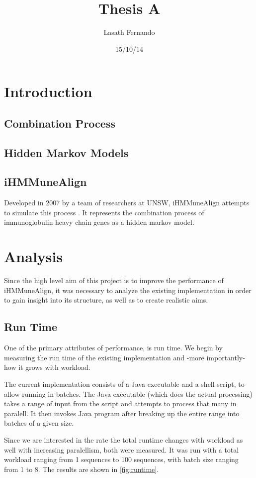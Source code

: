 \documentclass[a4paper,12pt]{report}
\author{Lasath Fernando}
\title{Thesis A}
\date{15/10/14}
\begin{document}
\maketitle


\chapter{Introduction}
\section{Combination Process}
\section{Hidden Markov Models}
\section{iHMMuneAlign}
Developed in 2007 by a team of researchers at UNSW, iHMMuneAlign attempts to simulate this process \autocite{iHMMuneAlign}.
It represents the combination process of immunoglobulin heavy chain genes as a hidden markov model.


\chapter{Analysis}
Since the high level aim of this project is to improve the performance of iHMMuneAlign, it was necessary to analyze the existing implementation in order to gain insight into its structure, as well as to create realistic aims. 

\section{Run Time}
One of the primary attributes of performance, is run time. We begin by measuring the run time of the existing implementation and -more importantly- how it grows with workload.

The current implementation consists of a Java executable and a shell script, to allow running in batches. The Java executable (which does the actual processing) takes a range of input from the script and attempts to process that many in paralell. It then invokes Java program after breaking up the entire range into batches of a given size.

Since we are interested in the rate the total runtime changes with workload as well with increasing paralellism, both were measured. It was run with a total workload ranging from 1 sequences to 100 sequences, with batch size ranging from 1 to 8. The results are shown in \autoref{fig:runtime}.
\end{document}
